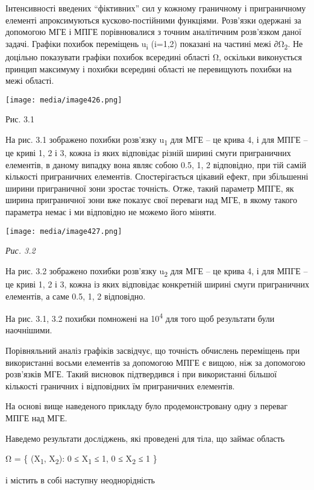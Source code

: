 Інтенсивності введених ``фіктивних'' сил у кожному граничному і
приграничному елементі апроксимуються кусково-постійними функціями.
Розв'язки одержані за допомогою МГЕ і МПГЕ порівнювалися з точним
аналітичним розв'язком даної задачі. Графіки похибок переміщень
u\textsubscript{i} (i=1,2) показані на частині межі ∂Ω\textsubscript{2}.
Не доцільно показувати графіки похибок всередині області Ω, оскільки
виконується принцип максимуму і похибки всередині області не перевищують
похибки на межі області.

\texttt{[image: media/image426.png]}

Рис. 3.1

На рис. 3.1 зображено похибки розв'язку u\textsubscript{1} для МГЕ -- це
крива 4, і для МПГЕ -- це криві 1, 2 і 3, кожна із яких відповідає
різній ширині смуги приграничних елементів, в даному випадку вона являє
собою 0.5, 1, 2 відповідно, при тій самій кількості приграничних
елементів. Спостерігається цікавий ефект, при збільшенні ширини
приграничної зони зростає точність. Отже, такий параметр МПГЕ, як ширина
приграничної зони вже показує свої переваги над МГЕ, в якому такого
параметра немає і ми відповідно не можемо його міняти.

\texttt{[image: media/image427.png]}

\emph{Рис. 3.2}

На рис. 3.2 зображено похибки розв'язку u\textsubscript{2} для МГЕ -- це
крива 4, і для МПГЕ -- це криві 1, 2 і 3, кожна із яких відповідає
конкретній ширині смуги приграничних елементів, а саме 0.5, 1, 2
відповідно.

На рис. 3.1, 3.2 похибки помножені на 10\textsuperscript{4} для того щоб
результати були наочнішими.

Порівняльний аналіз графіків засвідчує, що точність обчислень переміщень
при використанні восьми елементів за допомогою МПГЕ є вищою, ніж за
допомогою розв'язків МГЕ. Такий висновок підтвердився і при використанні
більшої кількості граничних і відповідних їм приграничних елементів.

На основі вище наведеного прикладу було продемонстровану одну з переваг
МПГЕ над МГЕ.

Наведемо результати досліджень, які проведені для тіла, що займає
область

Ω = \{ (X\textsubscript{1}, X\textsubscript{2}): 0 ≤ X\textsubscript{1}
≤ 1, 0 ≤ X\textsubscript{2} ≤ 1 \}

і містить в собі наступну неоднорідність


